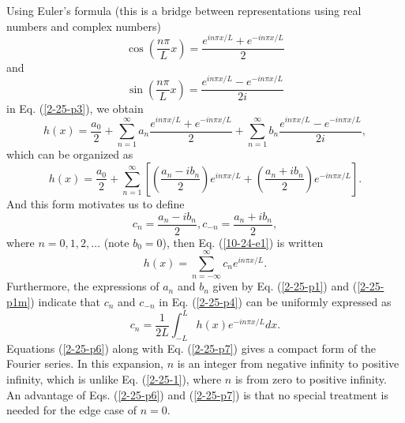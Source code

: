 \documentclass{article}
\begin{document}
Using Euler's formula (this is a bridge between representations using real
numbers and complex numbers)
\begin{equation}
  \cos \left( \frac{n \pi}{L} x \right) = \frac{e^{i n \pi x / L} + e^{- i n
  \pi x / L}}{2}
\end{equation}
and
\begin{equation}
  \sin \left( \frac{n \pi}{L} x \right) = \frac{e^{i n \pi x / L} - e^{- i n
  \pi x / L}}{2 i}
\end{equation}
in Eq. (\ref{2-25-p3}), we obtain
\begin{equation}
  h (x) = \frac{a_0}{2} + \sum_{n = 1}^{\infty} a_n \frac{e^{i n \pi x / L} +
  e^{- i n \pi x / L}}{2} + \sum_{n = 1}^{\infty} b_n \frac{e^{i n \pi x / L}
  - e^{- i n \pi x / L}}{2 i},
\end{equation}
which can be organized as
\begin{equation}
  \label{10-24-e1} h (x) = \frac{a_0}{2} + \sum_{n = 1}^{\infty} \left[ \left(
  \frac{a_n - i b_n}{2} \right) e^{i n \pi x / L} + \left( \frac{a_n + i
  b_n}{2} \right) e^{- i n \pi x / L} \right] .
\end{equation}
And this form motivates us to define
\begin{equation}
  \label{2-25-p4} c_n = \frac{a_n - i b_n}{2}, c_{- n} = \frac{a_n + i
  b_n}{2},
\end{equation}
where $n = 0, 1, 2, \ldots$ (note $b_0 = 0$), then Eq. (\ref{10-24-e1}) is
written
\begin{equation}
  \label{2-25-p6} h (x) = \sum_{n = - \infty}^{\infty} c_n e^{i n \pi x / L} .
\end{equation}
Furthermore, the expressions of $a_n$ and $b_n$ given by Eq. (\ref{2-25-p1})
and (\ref{2-25-p1m}) indicate that $c_n$ and $c_{- n}$ in Eq. (\ref{2-25-p4})
can be uniformly expressed as
\begin{equation}
  \label{2-25-p7} c_n = \frac{1}{2 L} \int_{- L}^L h (x) e^{- i n \pi x / L} d
  x.
\end{equation}
Equations (\ref{2-25-p6}) along with Eq. (\ref{2-25-p7}) gives a compact form
of the Fourier series. In this expansion, $n$ is an integer from negative
infinity to positive infinity, which is unlike Eq. (\ref{2-25-1}), where $n$
is from zero to positive infinity. An advantage of Eqs. (\ref{2-25-p6}) and
(\ref{2-25-p7}) is that no special treatment is needed for the edge case of $n
= 0$.
\end{document}
